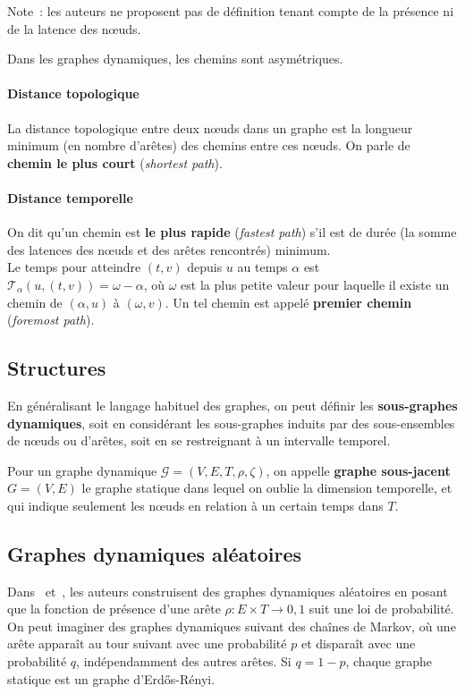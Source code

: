 \documentclass[12pt,a4paper]{article}
\begin{document}
Note~: les auteurs ne proposent pas de définition tenant compte de la
présence ni de la latence des nœuds.

Dans les graphes dynamiques, les chemins sont asymétriques.

\paragraph{Distance topologique} La distance topologique entre deux
nœuds dans un graphe est la longueur minimum (en nombre d'arêtes) des
chemins entre ces nœuds. On parle de \textbf{chemin le plus court}
(\textit{shortest path}).

\paragraph{Distance temporelle}
On dit qu'un chemin est \textbf{le plus rapide} (\textit{fastest
  path}) s'il est de durée (la somme des latences des nœuds et des
arêtes rencontrés) minimum.\\
Le temps pour atteindre \((t, v)\) depuis \(u\) au temps \(\alpha\)
est \(\mathcal{T}_{\alpha}(u, (t, v)) = \omega - \alpha\), où
\(\omega\) est la plus petite valeur pour laquelle il existe un chemin
de \((\alpha, u)\) à \((\omega, v)\). Un tel chemin est appelé
\textbf{premier chemin} (\textit{foremost path}).

\subsection{Structures}

En généralisant le langage habituel des graphes, on peut définir les
\textbf{sous-graphes dynamiques}, soit en considérant les sous-graphes
induits par des sous-ensembles de nœuds ou d'arêtes, soit en se
restreignant à un intervalle temporel.

Pour un graphe dynamique \(\mathcal{G} = (V, E, T, \rho, \zeta)\), on
appelle \textbf{graphe sous-jacent} \(G = (V, E)\) le graphe statique
dans lequel on oublie la dimension temporelle, et qui indique
seulement les nœuds en relation à un certain temps dans \(T\).

\subsection{Graphes dynamiques aléatoires}

Dans~\cite{casteigts2012time} et~\cite{kuhn2011dynamic}, les auteurs
construisent des graphes dynamiques aléatoires en posant que la
fonction de présence d'une arête \(\rho : E \times T \to {0, 1}\) suit
une loi de probabilité. On peut imaginer des graphes dynamiques
suivant des chaînes de Markov, où une arête apparaît au tour suivant
avec une probabilité \(p\) et disparaît avec une probabilité \(q\),
indépendamment des autres arêtes. Si \(q = 1 - p\), chaque graphe
statique est un graphe d'Erdős-Rényi.
\end{document}
